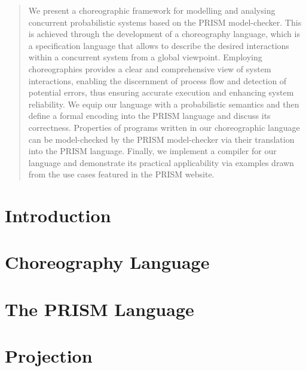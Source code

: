 \documentclass{lmcs} %
\theoremstyle{plain}\newtheorem{satz}[thm]{Satz} %
\begin{document}
\begin{abstract}
  \noindent We present a choreographic framework for modelling and
  analysing concurrent probabilistic systems based on the PRISM
  model-checker. This is achieved through the development of a
  choreography language, which is a specification language that allows
  to describe the desired interactions within a concurrent system from
  a global viewpoint. Employing choreographies provides a clear and
  comprehensive view of system interactions, enabling the discernment
  of process flow and detection of potential errors, thus ensuring
  accurate execution and enhancing system reliability. We equip our
  language with a probabilistic semantics and then define a formal
  encoding into the PRISM language and discuss its
  correctness. Properties of programs written in our choreographic
  language can be model-checked by the PRISM model-checker via their
  translation into the PRISM language.  Finally, we implement a
  compiler for our language and demonstrate its practical
  applicability via examples drawn from the use cases featured in the
  PRISM website.
\end{abstract}

\maketitle

\section{Introduction}\label{sec:intro}


%

\section{Choreography Language}\label{sec:chor}


\section{The PRISM Language}\label{sec:prism}


\section{Projection}\label{sec:proj}

\end{document}
